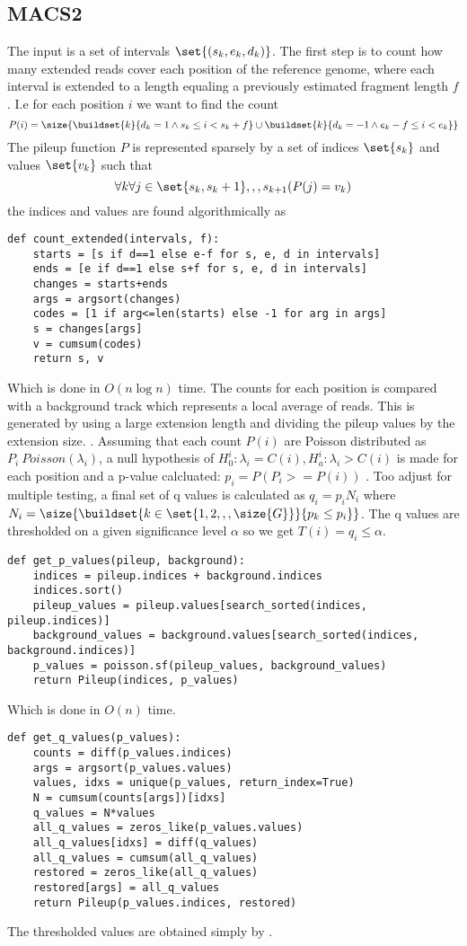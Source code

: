 \subsection{MACS2}
The input is a set of intervals $\set{(s_k, e_k, d_k)}$. The first step is to count how many extended reads cover each position of the reference genome, where each interval is extended to a length equaling a previously estimated fragment length $f$. I.e for each position $i$ we want to find the count
$$P(i)= \size{\buildset{k}{d_k=1 \wedge s_k \leq i < s_k+f} \cup \buildset{k}{d_k=-1 \wedge e_k-f \leq i < e_k}}$$
  The pileup function $P$ is represented sparsely by a set of indices $\set{s_k}$ and values $\set{v_k}$ such that $$\forall{k}\forall{j\in\set{s_k, s_k+1},,,s_{k+1}}(P(j) = v_k)$$
  the indices and values are found algorithmically as
  \begin{lstlisting}
def count_extended(intervals, f):    
    starts = [s if d==1 else e-f for s, e, d in intervals]
    ends = [e if d==1 else s+f for s, e, d in intervals]
    changes = starts+ends
    args = argsort(changes)
    codes = [1 if arg<=len(starts) else -1 for arg in args]
    s = changes[args]
    v = cumsum(codes)
    return s, v
  \end{lstlisting}
  Which is done in $O(n \log n)$ time. The counts for each position is compared with a background track which represents a local average of reads. This is generated by using a large extension length and dividing the pileup values by the extension size.
  .
  Assuming that each count $P(i)$ are Poisson distributed as $P_i ~ Poisson(\lambda_i)$, a null hypothesis of $H_0^i: \lambda_i=C(i), H_a^i:\lambda_i>C(i)$ is made for each position and a p-value calcluated: $p_i = P(P_i>=P(i))$ . Too adjust for multiple testing, a final set of q values is calculated as $q_i = p_iN_i$ where $N_i = \size{\buildset{k\in\set{1, 2,,,\size{G}}}{p_k\leq p_i}}$. The q values are thresholded on a given significance level $\alpha$ so we get $T(i) = q_i\leq \alpha$. 
  \begin{lstlisting}
def get_p_values(pileup, background):
    indices = pileup.indices + background.indices
    indices.sort()
    pileup_values = pileup.values[search_sorted(indices, pileup.indices)]
    background_values = background.values[search_sorted(indices, background.indices)]
    p_values = poisson.sf(pileup_values, background_values)
    return Pileup(indices, p_values)
  \end{lstlisting}
Which is done in $O(n)$ time.
\begin{lstlisting}
def get_q_values(p_values):
    counts = diff(p_values.indices)
    args = argsort(p_values.values)
    values, idxs = unique(p_values, return_index=True)
    N = cumsum(counts[args])[idxs]
    q_values = N*values
    all_q_values = zeros_like(p_values.values)
    all_q_values[idxs] = diff(q_values)
    all_q_values = cumsum(all_q_values)
    restored = zeros_like(all_q_values)
    restored[args] = all_q_values
    return Pileup(p_values.indices, restored)
  \end{lstlisting}
  The thresholded values are obtained simply by .

